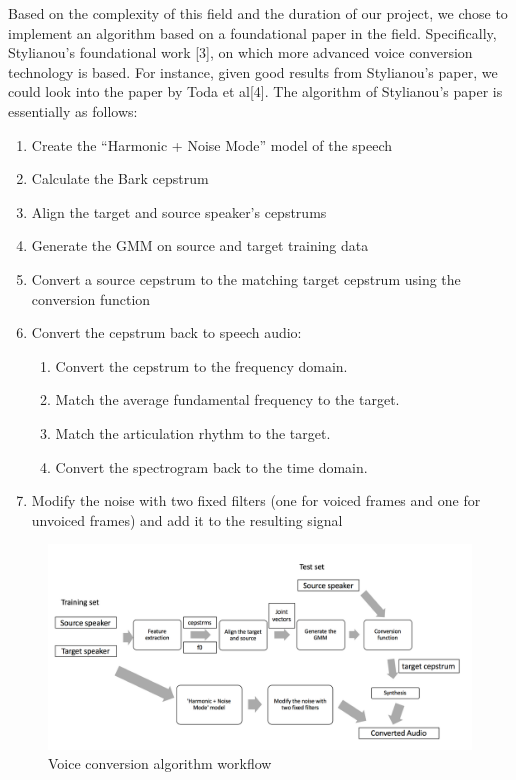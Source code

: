 \documentclass{article}
\begin{document}
Based on the complexity of this field and the duration of our project, we chose to implement an algorithm based on a foundational paper in the field. Specifically, Stylianou's foundational work [3], on which more advanced voice conversion technology is based. For instance, given good results from Stylianou's paper, we could look into the paper by Toda et al[4]. The algorithm of Stylianou's paper is essentially as follows:
\begin{enumerate}
\item Create the ``Harmonic + Noise Mode'' model of the speech

\item Calculate the Bark cepstrum

\item Align the target and source speaker's cepstrums

\item Generate the GMM on source and target training data

\item Convert a source cepstrum to the matching target cepstrum using the conversion function
\item Convert the cepstrum back to speech audio:
\begin{enumerate}
\item Convert the cepstrum to the frequency domain.
\item Match the average fundamental frequency to the target.
\item Match the articulation rhythm to the target.
\item Convert the spectrogram back to the time domain.
\end{enumerate}

\item Modify the noise with two fixed filters (one for voiced frames and one for unvoiced frames) and add it to the resulting signal
\end{enumerate}

\begin{figure}
\centering
\includegraphics[width=\textwidth]{algorithm.png}
\caption{Voice conversion algorithm workflow}\label{fig:algo}
\end{figure}
\end{document}

